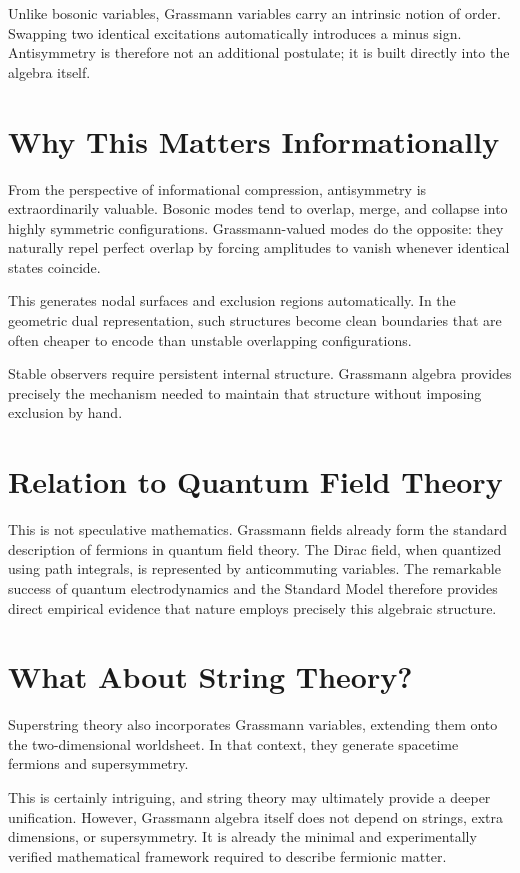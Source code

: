 Unlike bosonic variables, Grassmann variables carry an intrinsic notion of order. Swapping two identical excitations automatically introduces a minus sign. Antisymmetry is therefore not an additional postulate; it is built directly into the algebra itself.

\section{Why This Matters Informationally}

From the perspective of informational compression, antisymmetry is extraordinarily valuable. Bosonic modes tend to overlap, merge, and collapse into highly symmetric configurations. Grassmann-valued modes do the opposite: they naturally repel perfect overlap by forcing amplitudes to vanish whenever identical states coincide.

This generates nodal surfaces and exclusion regions automatically. In the geometric dual representation, such structures become clean boundaries that are often cheaper to encode than unstable overlapping configurations.

Stable observers require persistent internal structure. Grassmann algebra provides precisely the mechanism needed to maintain that structure without imposing exclusion by hand.

\section{Relation to Quantum Field Theory}

This is not speculative mathematics. Grassmann fields already form the standard description of fermions in quantum field theory. The Dirac field, when quantized using path integrals, is represented by anticommuting variables. The remarkable success of quantum electrodynamics and the Standard Model therefore provides direct empirical evidence that nature employs precisely this algebraic structure.

\section{What About String Theory?}

Superstring theory also incorporates Grassmann variables, extending them onto the two-dimensional worldsheet. In that context, they generate spacetime fermions and supersymmetry.

This is certainly intriguing, and string theory may ultimately provide a deeper unification. However, Grassmann algebra itself does not depend on strings, extra dimensions, or supersymmetry. It is already the minimal and experimentally verified mathematical framework required to describe fermionic matter.

